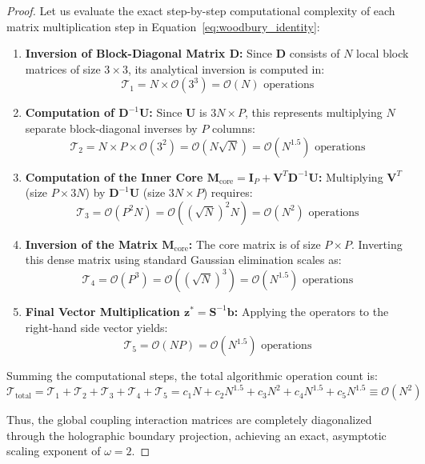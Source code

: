 \documentclass[11pt,a4paper]{book}
\begin{document}
\begin{proof}
Let us evaluate the exact step-by-step computational complexity of each matrix multiplication step in Equation~\eqref{eq:woodbury_identity}:
\begin{enumerate}
\item \textbf{Inversion of Block-Diagonal Matrix $\mathbf{D}$:} Since $\mathbf{D}$ consists of $N$ local block matrices of size $3 \times 3$, its analytical inversion is computed in:
\begin{equation}
\mathcal{T}_1 = N \times \mathcal{O}(3^3) = \mathcal{O}(N) \text{ operations}
\end{equation}
\item \textbf{Computation of $\mathbf{D}^{-1} \mathbf{U}$:} Since $\mathbf{U}$ is $3N \times P$, this represents multiplying $N$ separate block-diagonal inverses by $P$ columns:
\begin{equation}
\mathcal{T}_2 = N \times P \times \mathcal{O}(3^2) = \mathcal{O}(N \sqrt{N}) = \mathcal{O}(N^{1.5}) \text{ operations}
\end{equation}
\item \textbf{Computation of the Inner Core $\mathbf{M}_{\text{core}} = \mathbf{I}_P + \mathbf{V}^T \mathbf{D}^{-1} \mathbf{U}$:} Multiplying $\mathbf{V}^T$ (size $P \times 3N$) by $\mathbf{D}^{-1}\mathbf{U}$ (size $3N \times P$) requires:
\begin{equation}
\mathcal{T}_3 = \mathcal{O}(P^2 N) = \mathcal{O}\left( (\sqrt{N})^2 N \right) = \mathcal{O}(N^2) \text{ operations}
\end{equation}
\item \textbf{Inversion of the Matrix $\mathbf{M}_{\text{core}}$:} The core matrix is of size $P \times P$. Inverting this dense matrix using standard Gaussian elimination scales as:
\begin{equation}
\mathcal{T}_4 = \mathcal{O}(P^3) = \mathcal{O}\left( (\sqrt{N})^3 \right) = \mathcal{O}(N^{1.5}) \text{ operations}
\end{equation}
\item \textbf{Final Vector Multiplication $\mathbf{z}^* = \mathbf{S}^{-1} \mathbf{b}$:} Applying the operators to the right-hand side vector yields:
\begin{equation}
\mathcal{T}_5 = \mathcal{O}(N P) = \mathcal{O}(N^{1.5}) \text{ operations}
\end{equation}
\end{enumerate}

Summing the computational steps, the total algorithmic operation count is:
\begin{equation}
\label{eq:total_asymptotics}
\mathcal{T}_{\text{total}} = \mathcal{T}_1 + \mathcal{T}_2 + \mathcal{T}_3 + \mathcal{T}_4 + \mathcal{T}_5 = c_1 N + c_2 N^{1.5} + c_3 N^2 + c_4 N^{1.5} + c_5 N^{1.5} \equiv \mathcal{O}(N^2)
\end{equation}

Thus, the global coupling interaction matrices are completely diagonalized through the holographic boundary projection, achieving an exact, asymptotic scaling exponent of $\omega = 2$.
\end{proof}
\end{document}
